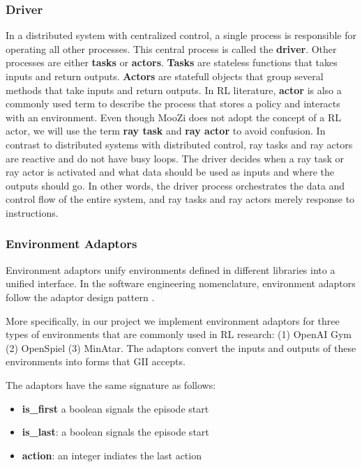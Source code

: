 \documentclass[12pt]{article}
\begin{document}
\subsubsection{Driver}
In a distributed system with centralized control, a single process is responsible for operating all other processes.
This central process is called the \textbf{driver}.
Other processes are either \textbf{tasks} or \textbf{actors}.
\textbf{Tasks} are stateless functions that takes inputs and return outputs.
\textbf{Actors} are statefull objects that group several methods that take inputs and return outputs.
In RL literature, \textbf{actor} is also a commonly used term to describe the process that stores a policy and interacts with an environment.
Even though MooZi does not adopt the concept of a RL actor, we will use the term \textbf{ray task} and \textbf{ray actor} to avoid confusion.
In contrast to distributed systems with distributed control, ray tasks and ray actors are reactive and do not have busy loops.
The driver decides when a ray task or ray actor is activated and what data should be used as inputs and where the outputs should go.
In other words, the driver process orchestrates the data and control flow of the entire system, and ray tasks and ray actors merely response to instructions.

\subsubsection{Environment Adaptors}
Environment adaptors unify environments defined in different libraries into a unified interface.
In the software engineering nomenclature, environment adaptors follow the adaptor design pattern \cite{AdapterPattern__2022}.

More specifically, in our project we implement environment adaptors for three types of environments that are commonly used in RL research:
(1) OpenAI Gym (2) OpenSpiel (3) MinAtar.
The adaptors convert the inputs and outputs of these environments into forms that GII accepts.

The adaptors have the same signature as follows:
\begin{itemize}
    \item \textbf{is_first} a boolean signals the episode start
    \item \textbf{is_last}: a boolean signals the episode start
    \item \textbf{action}: an integer indiates the last action
\end{itemize}
\end{document}
